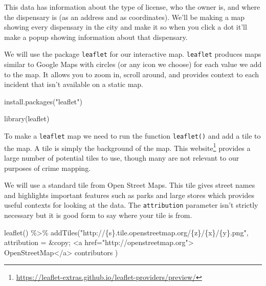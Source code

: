\documentclass[
]{krantz}
\makeatletter
\newenvironment{Shaded}{\begin{snugshade}}{\end{snugshade}}
\newcommand{\AttributeTok}[1]{\textcolor[rgb]{0.61,0.61,0.61}{#1}}
\newcommand{\FunctionTok}[1]{\textcolor[rgb]{0,0,0}{#1}}
\newcommand{\NormalTok}[1]{#1}
\newcommand{\SpecialCharTok}[1]{\textcolor[rgb]{0,0,0}{#1}}
\newcommand{\StringTok}[1]{\textcolor[rgb]{0.5,0.5,0.5}{#1}}
\renewcommand{\href}[2]{#2\footnote{\url{#1}}}
\newenvironment{kframe}{%
\medskip{}
\setlength{\fboxsep}{.8em}
 \def\at@end@of@kframe{}%
 \ifinner\ifhmode%
  \def\at@end@of@kframe{\end{minipage}}%
  \begin{minipage}{\columnwidth}%
 \fi\fi%
 \def\FrameCommand##1{\hskip\@totalleftmargin \hskip-\fboxsep
 \colorbox{shadecolor}{##1}\hskip-\fboxsep
     \hskip-\linewidth \hskip-\@totalleftmargin \hskip\columnwidth}%
 \MakeFramed {\advance\hsize-\width
   \@totalleftmargin\z@ \linewidth\hsize
   \@setminipage}}%
 {\par\unskip\endMakeFramed%
 \at@end@of@kframe}
\renewenvironment{Shaded}{\begin{kframe}}{\end{kframe}}
\makeatother
\begin{document}
This data has information about the type of license, who the
owner is, and where the dispensary is (as an address and as
coordinates). We'll be making a map showing every dispensary
in the city and make it so when you click a dot it'll make a
popup showing information about that dispensary.

We will use the package \texttt{leaflet} for our interactive
map. \texttt{leaflet} produces maps similar to Google Maps
with circles (or any icon we choose) for each value we add
to the map. It allows you to zoom in, scroll around, and
provides context to each incident that isn't available on a
static map.

\begin{Shaded}
\begin{Highlighting}[]
\FunctionTok{install.packages}\NormalTok{(}\StringTok{"leaflet"}\NormalTok{)}
\end{Highlighting}
\end{Shaded}

\begin{Shaded}
\begin{Highlighting}[]
\FunctionTok{library}\NormalTok{(leaflet)}
\end{Highlighting}
\end{Shaded}

To make a \texttt{leaflet} map we need to run the function
\texttt{leaflet()} and add a tile to the map. A tile is
simply the background of the map. This
\href{https://leaflet-extras.github.io/leaflet-providers/preview/}{website}
provides a large number of potential tiles to use, though
many are not relevant to our purposes of crime mapping.

We will use a standard tile from Open Street Maps. This tile
gives street names and highlights important features such as
parks and large stores which provides useful contexts for
looking at the data. The \texttt{attribution} parameter
isn't strictly necessary but it is good form to say where
your tile is from.

\begin{Shaded}
\begin{Highlighting}[]
\FunctionTok{leaflet}\NormalTok{() }\SpecialCharTok{\%\textgreater{}\%}
  \FunctionTok{addTiles}\NormalTok{(}\StringTok{"http://\{s\}.tile.openstreetmap.org/\{z\}/\{x\}/\{y\}.png"}\NormalTok{,}
    \AttributeTok{attribution =} \StringTok{\textquotesingle{}\&copy; \textless{}a href="http://openstreetmap.org"\textgreater{}}
\StringTok{                OpenStreetMap\textless{}/a\textgreater{} contributors\textquotesingle{}}
\NormalTok{  )}
\end{Highlighting}
\end{Shaded}
\end{document}
